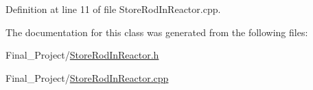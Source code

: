 Definition at line 11 of file Store\-Rod\-In\-Reactor.\-cpp.



The documentation for this class was generated from the following files\-:\begin{DoxyCompactItemize}
\item 
Final\-\_\-\-Project/\hyperlink{StoreRodInReactor_8h}{Store\-Rod\-In\-Reactor.\-h}\item 
Final\-\_\-\-Project/\hyperlink{StoreRodInReactor_8cpp}{Store\-Rod\-In\-Reactor.\-cpp}\end{DoxyCompactItemize}
